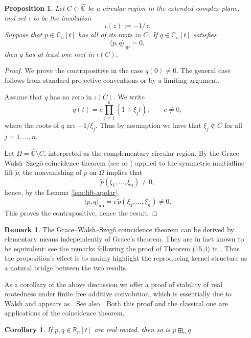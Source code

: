 \documentclass[11pt]{amsart}
\newtheorem{prop}[thm]{Proposition}
\newtheorem{cor}[thm]{Corollary}
\theoremstyle{definition}
\newtheorem{remark}[thm]{Remark}
\begin{document}
\begin{prop}\label{prop:apolar-root-location}
Let $C\subset \widehat{\mathbb C}$ be a circular region in the extended complex plane, and set $\iota$ to be the involution
\[
\iota(z):=-1/z.
\]
Suppose that $p\in\mathbb C_n[t]$ has all of its roots in $C$. If $q\in\mathbb C_n[t]$ satisfies
\[
\langle p,q\rangle_{\mathrm{ap}}=0,
\]
then $q$ has at least one root in $\iota(C)$.
\end{prop}

\begin{proof}
We prove the contrapositive in the case $q(0)\neq 0$. The general case follows from standard projective conventions or by a limiting argument.

Assume that $q$ has no zero in $\iota(C)$. We write
\[
q(t)=c\prod_{j=1}^n(1+\xi_jt),
\qquad c\neq 0, 
\]
where the roots of $q$ are $-1/\xi_j$. Thus by assumption we have that $\xi_j\not\in C$ for all $j=1,\dotsc,n$.

Let $\Omega=\widehat{\mathbb C}\setminus C$, interpreted as the complementary circular region. By the Grace--Walsh--Szeg\H{o} coincidence theorem (see \cite[Theorem (15,4)]{Marden} or \cite{BB09})  applied to the symmetric multiaffine lift $\widetilde p$, the nonvanishing of $p$ on $\Omega$ implies that
\[
\widetilde p(\xi_1,\ldots,\xi_n)\neq 0,
\]
hence, by the Lemma \ref{lem:lift-apolar},
\[
\langle p,q\rangle_{\mathrm{ap}}
=
c\,\widetilde p(\xi_1,\ldots,\xi_n)
\neq 0.
\]
This proves the contrapositive, hence the result.
\end{proof}

\begin{remark}
    The Grace--Walsh--Szeg\H{o} coincidence theorem can be derived by elementary means independently of Grace's theorem. They are in fact known to be equivalent: see the remarks following the proof of Theorem (15,4) in \cite{Marden}. Thus the proposition's effect is to mainly highlight the reproducing kernel structure as a natural bridge between the two results.
\end{remark}


As a corollary of the above discussion we offer a proof of stability of real rootedness under finite free additive convolution, which is essentially due to Walsh \cite{Wal22} and appears as \cite[Theorem (18,1)]{Marden}. See also \cite{MSS22}. Both this proof and the classical one are applications of the coincidence theorem.

\begin{cor}\label{cor:real-rooted-ffac}
    If $p,q\in \mathbb R_n[t]$ are real rooted, then so is $p\boxplus_n q$
\end{cor}
\end{document}
